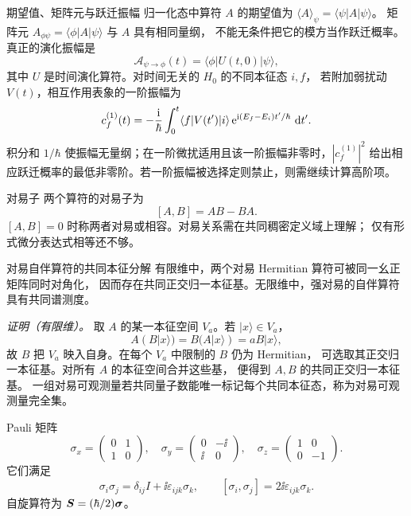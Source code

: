 \begin{advdefinition}{期望值、矩阵元与跃迁振幅}\label{advA6:def:expectation-transition}
归一化态中算符 $A$ 的期望值为 $\langle A\rangle_\psi=\langle\psi|A|\psi\rangle$。
矩阵元 $A_{\phi\psi}=\langle\phi|A|\psi\rangle$ 与 $A$ 具有相同量纲，
不能无条件把它的模方当作跃迁概率。真正的演化振幅是
\[
 \mathcal A_{\psi\to\phi}(t)=\langle\phi|U(t,0)|\psi\rangle,
\]
其中 $U$ 是时间演化算符。对时间无关的 $H_0$ 的不同本征态 $i,f$，
若附加弱扰动 $V(t)$，相互作用表象的一阶振幅为
\[
 c_f^{(1)}(t)=-\frac{\mathrm i}{\hbar}\int_0^t
 \langle f|V(t')|i\rangle\,
 \mathrm e^{\mathrm i(E_f-E_i)t'/\hbar}\,\mathop{}\!\mathrm d t'.
\]
积分和 $1/\hbar$ 使振幅无量纲；在一阶微扰适用且该一阶振幅非零时，$|c_f^{(1)}|^2$ 给出相应跃迁概率的最低非零阶。若一阶振幅被选择定则禁止，则需继续计算高阶项。
\end{advdefinition}

\begin{advdefinition}{对易子}\label{advA6:def:commutator}
两个算符的对易子为
\[
 [A,B]=AB-BA.
\]
$[A,B]=0$ 时称两者对易或相容。对易关系需在共同稠密定义域上理解；
仅有形式微分表达式相等还不够。
\end{advdefinition}

\begin{advtheorem}{对易自伴算符的共同本征分解}\label{advA6:thm:commuting-observables}
有限维中，两个对易 Hermitian 算符可被同一幺正矩阵同时对角化，
因而存在共同正交归一本征基。无限维中，强对易的自伴算符具有共同谱测度。
\end{advtheorem}

\noindent\textit{证明（有限维）。}
取 $A$ 的某一本征空间 $V_a$。若 $|x\rangle\in V_a$，
\[
 A(B|x\rangle)=B(A|x\rangle)=aB|x\rangle,
\]
故 $B$ 把 $V_a$ 映入自身。在每个 $V_a$ 中限制的 $B$ 仍为 Hermitian，
可选取其正交归一本征基。对所有 $A$ 的本征空间合并这些基，
便得到 $A,B$ 的共同正交归一本征基。
一组对易可观测量若共同量子数能唯一标记每个共同本征态，称为对易可观测量完全集。

\begin{advdefinition}{Pauli 矩阵}\label{advA6:def:pauli}
\[
 \sigma_x=\begin{pmatrix}0&1\\1&0\end{pmatrix},\quad
 \sigma_y=\begin{pmatrix}0&-\ii\\\ii&0\end{pmatrix},\quad
 \sigma_z=\begin{pmatrix}1&0\\0&-1\end{pmatrix}.
\]
它们满足
\[
 \sigma_i\sigma_j=\delta_{ij}I+\ii\varepsilon_{ijk}\sigma_k,
\qquad
 [\sigma_i,\sigma_j]=2\ii\varepsilon_{ijk}\sigma_k.
\]
自旋算符为 $\bm{S}=(\hbar/2)\bm{\sigma}$。
\end{advdefinition}


